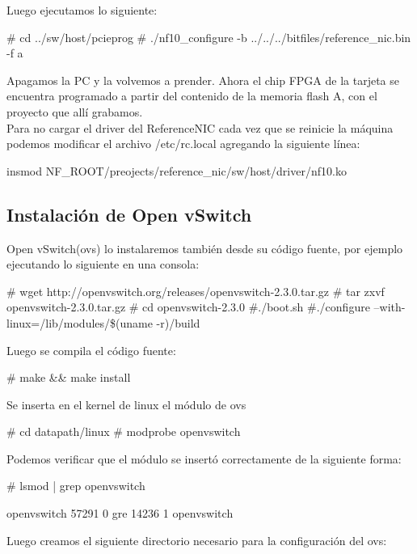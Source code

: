 Luego ejecutamos lo siguiente:

\begin{bash}
# cd ../sw/host/pcieprog
# ./nf10_configure -b ../../../bitfiles/reference_nic.bin -f a
\end{bash}

Apagamos la PC y la volvemos a prender. Ahora el chip FPGA de la tarjeta se encuentra programado a partir del contenido de la memoria flash A, con el proyecto que allí grabamos.\\

Para no cargar el driver del ReferenceNIC cada vez que se reinicie la máquina podemos modificar el archivo /etc/rc.local agregando la siguiente línea:

\begin{bash}
insmod NF_ROOT/preojects/reference_nic/sw/host/driver/nf10.ko
\end{bash}

\subsection{Instalación de Open vSwitch}
Open vSwitch(ovs) lo instalaremos también desde su código fuente, por ejemplo ejecutando lo siguiente en una consola:

\begin{bash}
# wget http://openvswitch.org/releases/openvswitch-2.3.0.tar.gz
# tar zxvf openvswitch-2.3.0.tar.gz
# cd openvswitch-2.3.0
#./boot.sh
#./configure --with-linux=/lib/modules/\$(uname -r)/build
\end{bash}

Luego se compila el código fuente:

\begin{bash}
# make && make install
\end{bash}

Se inserta en el kernel de linux el módulo de ovs

\begin{bash}
# cd datapath/linux
# modprobe openvswitch
\end{bash}

Podemos verificar que el módulo se insertó correctamente de la siguiente forma:

\begin{bash}
# lsmod | grep openvswitch

openvswitch    57291      0  
gre         14236         1     openvswitch
\end{bash}

Luego creamos el siguiente directorio necesario para la configuración del ovs:

